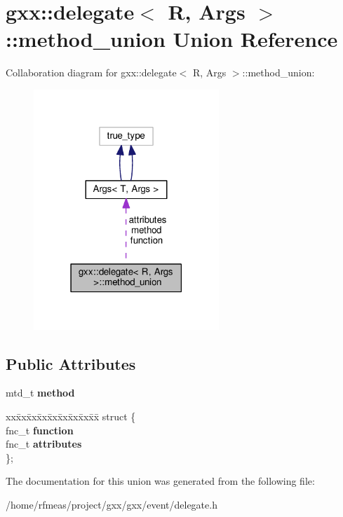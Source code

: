 \hypertarget{uniongxx_1_1delegate_1_1method__union}{}\section{gxx\+:\+:delegate$<$ R, Args $>$\+:\+:method\+\_\+union Union Reference}
\label{uniongxx_1_1delegate_1_1method__union}


Collaboration diagram for gxx\+:\+:delegate$<$ R, Args $>$\+:\+:method\+\_\+union\+:
\nopagebreak
\begin{figure}[H]
\begin{center}
\leavevmode
\includegraphics[width=198pt]{uniongxx_1_1delegate_1_1method__union__coll__graph}
\end{center}
\end{figure}
\subsection*{Public Attributes}
\begin{DoxyCompactItemize}
\item 
mtd\+\_\+t {\bfseries method}\hypertarget{uniongxx_1_1delegate_1_1method__union_a20ac73a8e981baf977b970f5102ff594}{}\label{uniongxx_1_1delegate_1_1method__union_a20ac73a8e981baf977b970f5102ff594}

\item 
\begin{tabbing}
xx\=xx\=xx\=xx\=xx\=xx\=xx\=xx\=xx\=\kill
struct \{\\
\>fnc\_t {\bfseries function}\\
\>fnc\_t {\bfseries attributes}\\
\}; \hypertarget{uniongxx_1_1delegate_1_1method__union_a9a52abfba2d066865ce55ba942a67341}{}\label{uniongxx_1_1delegate_1_1method__union_a9a52abfba2d066865ce55ba942a67341}
\\

\end{tabbing}\end{DoxyCompactItemize}


The documentation for this union was generated from the following file\+:\begin{DoxyCompactItemize}
\item 
/home/rfmeas/project/gxx/gxx/event/delegate.\+h\end{DoxyCompactItemize}
